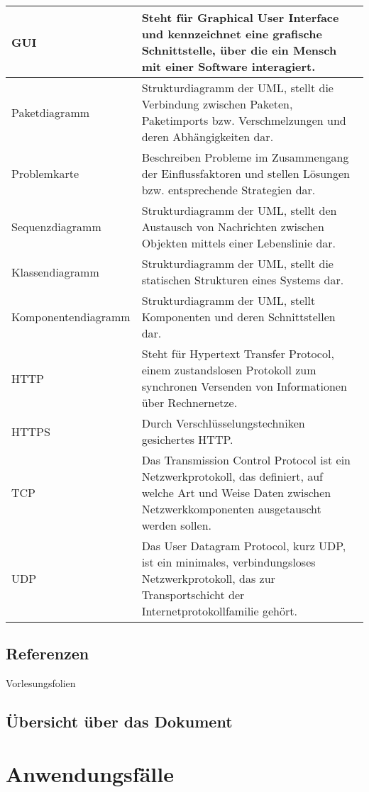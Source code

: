 \documentclass[fontsize=12pt,paper=a4,twoside]{scrartcl}
\begin{document}
\begin{longtable}{ |  l | p{12cm} |}
GUI &Steht für Graphical User Interface und kennzeichnet
eine grafische Schnittstelle, über die ein Mensch mit
einer Software interagiert.\\ \hline
Paketdiagramm &Strukturdiagramm der UML, stellt die Verbindung
zwischen Paketen, Paketimports bzw. Verschmelzungen
und deren Abhängigkeiten dar. \\ \hline
Problemkarte &Beschreiben Probleme im Zusammengang der Einflussfaktoren
und stellen Lösungen bzw. entsprechende
Strategien dar. \\ \hline
Sequenzdiagramm &Strukturdiagramm der UML, stellt den Austausch
von Nachrichten zwischen Objekten mittels einer Lebenslinie
dar. \\ \hline
Klassendiagramm &Strukturdiagramm der UML, stellt die statischen
Strukturen eines Systems dar.\\ \hline
Komponentendiagramm &Strukturdiagramm der UML, stellt Komponenten
und deren Schnittstellen dar. \\ \hline
HTTP &Steht für Hypertext Transfer Protocol, einem zustandslosen
Protokoll zum synchronen Versenden von
Informationen über Rechnernetze.\\ \hline
HTTPS &Durch Verschlüsselungstechniken gesichertes HTTP. \\ \hline
TCP &Das Transmission Control Protocol ist ein Netzwerkprotokoll, das definiert, auf welche Art und Weise
 Daten zwischen Netzwerkkomponenten ausgetauscht werden sollen. \\ \hline
UDP &Das User Datagram Protocol, kurz UDP, ist ein minimales, verbindungsloses Netzwerkprotokoll, 
das zur Transportschicht der Internetprotokollfamilie gehört.\\ \hline
   

 \end{longtable}

\subsection{Referenzen}
Vorlesungsfolien


\subsection{Übersicht über das Dokument}

\newpage
\section{Anwendungsfälle} \label{sec:Anwendungsfälle}
\end{document}
